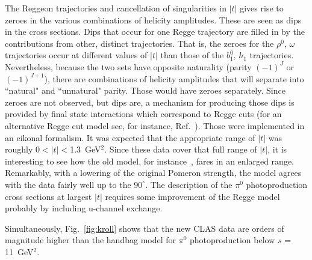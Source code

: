 \documentclass[aps,prc,twocolumn,floatfix,showpacs,preprintnumbers,amsmath,amssymb,superscriptaddress]{revtex4-1}
\begin{document}
The Reggeon trajectories and cancellation of singularities in $|t|$ 
gives rise to zeroes in the various combinations of helicity 
amplitudes. These are seen as dips in the cross sections. Dips that 
occur for one Regge trajectory are filled in by the contributions 
from other, distinct trajectories. That is, the zeroes for the 
$\rho^0, \, \omega$ trajectories occur at different values of $|t|$ 
than those of the $b_1^0, \, h_1$ trajectories. Nevertheless, 
because the two sets have opposite naturality (parity $(-1)^J$ or 
$(-1)^{J+1}$), there are combinations of helicity amplitudes that 
will separate into ``natural" and ``unnatural" parity.  Those would 
have zeroes separately. Since zeroes are not observed, but dips 
are, a mechanism for producing those dips is provided by final 
state interactions which correspond to Regge cuts (for an 
alternative Regge cut model see, for instance, Ref.~\cite{Laget}). 
Those were implemented in an eikonal formalism. It was expected 
that the appropriate range of $|t|$ was roughly $0 < |t| 
<$1.3~GeV$^2$. Since these data cover that full range of $|t|$, it 
is interesting to see how the old model, for instance~\cite{Goldstein}, 
fares in an enlarged range. Remarkably, with a lowering of the 
original Pomeron strength, %
the model agrees with the data 
fairly well up to the $90^\circ$.  The description of the $\pi^0$ 
photoproduction cross sections at largest $|t|$ requires some
improvement of the Regge model probably by including u-channel 
exchange.

Simultaneously, Fig.~\ref{fig:kroll} shows that the new CLAS data 
are orders of magnitude higher than 
the handbag model for $\pi^0$ photoproduction below 
$s$ = 11~GeV$^2$.
\end{document}
